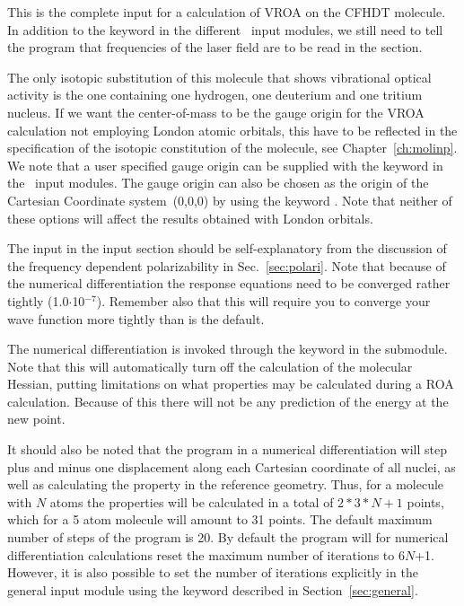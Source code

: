 This is the complete input for a calculation of
VROA on the CFHDT
molecule.  
In addition to the keyword  in the different \aba\ input
modules, we still need to tell the program that frequencies of the
laser field are to be
read in the  section.

The only isotopic substitution of this molecule that shows
vibrational optical activity is the one containing one hydrogen, one
deuterium and one tritium nucleus. If we want the
center-of-mass to 
be the gauge origin for the VROA calculation not
employing London atomic orbitals, this have to be reflected in the
specification of the isotopic constitution of the molecule, see
Chapter~\ref{ch:molinp}.  
We note that a user specified gauge origin can be supplied with the
keyword  in the \aba\ input modules. The gauge origin
can also be chosen as the origin of the Cartesian Coordinate
system~(0,0,0) by using the keyword . Note that neither of
these options will affect the results obtained with London orbitals.

The input in the  input section should be
self-explanatory from the discussion of the frequency dependent
polarizability in Sec.~\ref{sec:polari}. Note
that because of the numerical differentiation the response equations need to be converged 
rather tightly (1.0$\cdot$10$^{-7}$). Remember also that this will
require you to converge your wave function more
tightly than is the default. 

The numerical differentiation is
invoked through the keyword 
 in the  submodule. Note that this will
automatically 
turn off the calculation of the molecular Hessian,
putting limitations 
on what properties may be calculated during a ROA calculation. Because
of this there will not be any prediction of the energy at the new
point.

It should also be noted that the program in a numerical differentiation will
step plus and minus one displacement along each Cartesian
coordinate
of all nuclei, as well as calculating the property in the reference
geometry. Thus, for a molecule with $N$ atoms the properties will be
calculated in a total of $2*3*N + 1$ points, which for a 5 atom 
molecule will amount to 31 points. The default maximum number of steps
of the program is 20. By default the program will for numerical
differentiation calculations reset the maximum number of iterations to
6$N$+1. However, it is also possible to set the number of iterations
explicitly  in the general input module using the keyword 
described in Section~\ref{sec:general}.

